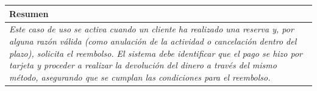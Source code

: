     \begin{table}[H]
        \begin{tabular}{llllllll}
    \hline
    \multicolumn{8}{|l|}{\cellcolor[HTML]{F2F2F2}Resumen}                                                                                                                                                                                                                                                                                                                                                                                             \\ \hline
    \multicolumn{8}{|p{15cm}|}{{\color[HTML]{808080} \textit{Este caso de uso se activa cuando un cliente ha realizado una reserva y, por alguna razón válida (como anulación de la actividad o cancelación dentro del plazo), solicita el reembolso. El sistema debe identificar que el pago se hizo por tarjeta y proceder a realizar la devolución del dinero a través del mismo método, asegurando que se cumplan las condiciones para el reembolso.}}} \\ \hline
    \end{tabular}
    \end{table}


